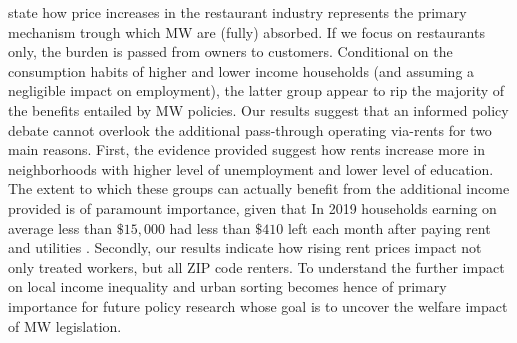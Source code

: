 \textcite{allegretto2018local} state how price increases in the restaurant industry represents the primary mechanism
trough which MW are (fully) absorbed.  If we focus on restaurants only, the burden is passed from owners to customers. 
Conditional on the consumption habits of higher and lower income households (and assuming a negligible impact on 
employment), the latter group appear to rip the majority of the benefits entailed by MW policies. Our results suggest that 
an informed policy debate cannot overlook the additional pass-through operating via-rents for two main reasons. 
First, the evidence provided suggest how rents increase more in neighborhoods with higher level of unemployment and 
lower level of education. The extent to which these groups can actually benefit from the additional income provided 
is of paramount importance, given that In 2019 households earning on average less than $\$15,000$ 
had less than $\$410$ left each month after paying rent and utilities \parencite{fernald2020americas}. Secondly, our 
results indicate how rising rent prices impact not only treated workers, but all ZIP code renters. To understand  the further 
impact on local income inequality and urban sorting becomes hence of primary importance for future policy research 
whose goal is to uncover the welfare impact of MW legislation. 




 